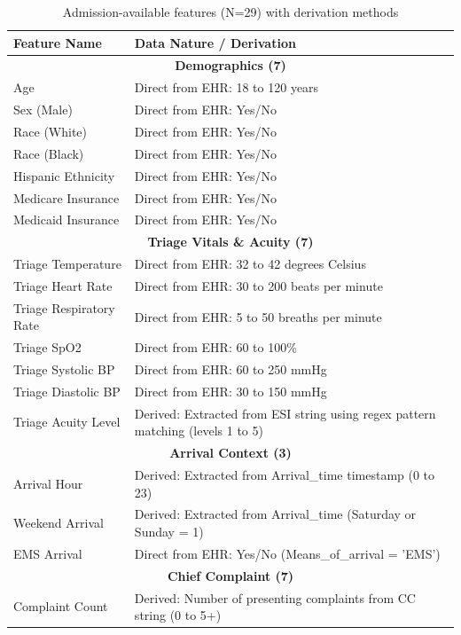 \documentclass[harvard,article]{frontiersinFPHY_FAMS}
\begin{document}
\begin{table}[H]
\centering
\caption{Admission-available features (N=29) with derivation methods}
\label{tab:features}
\begin{tabularx}{\textwidth}{@{}l X@{}}
\toprule
\textbf{Feature Name} & \textbf{Data Nature / Derivation} \\
\midrule
\multicolumn{2}{c}{\textbf{Demographics (7)}} \\
\midrule
Age & Direct from EHR: 18 to 120 years \\
Sex (Male) & Direct from EHR: Yes/No \\
Race (White) & Direct from EHR: Yes/No \\
Race (Black) & Direct from EHR: Yes/No \\
Hispanic Ethnicity & Direct from EHR: Yes/No \\
Medicare Insurance & Direct from EHR: Yes/No \\
Medicaid Insurance & Direct from EHR: Yes/No \\
\midrule
\multicolumn{2}{c}{\textbf{Triage Vitals \& Acuity (7)}} \\
\midrule
Triage Temperature & Direct from EHR: 32 to 42 degrees Celsius \\
Triage Heart Rate & Direct from EHR: 30 to 200 beats per minute \\
Triage Respiratory Rate & Direct from EHR: 5 to 50 breaths per minute \\
Triage SpO2 & Direct from EHR: 60 to 100\% \\
Triage Systolic BP & Direct from EHR: 60 to 250 mmHg \\
Triage Diastolic BP & Direct from EHR: 30 to 150 mmHg \\
Triage Acuity Level & Derived: Extracted from ESI string using regex pattern matching (levels 1 to 5) \\
\midrule
\multicolumn{2}{c}{\textbf{Arrival Context (3)}} \\
\midrule
Arrival Hour & Derived: Extracted from Arrival\_time timestamp (0 to 23) \\
Weekend Arrival & Derived: Extracted from Arrival\_time (Saturday or Sunday = 1) \\
EMS Arrival & Direct from EHR: Yes/No (Means\_of\_arrival = 'EMS') \\
\midrule
\multicolumn{2}{c}{\textbf{Chief Complaint (7)}} \\
\midrule
Complaint Count & Derived: Number of presenting complaints from CC string (0 to 5+) \\

\end{tabularx}
\end{table}
\end{document}
